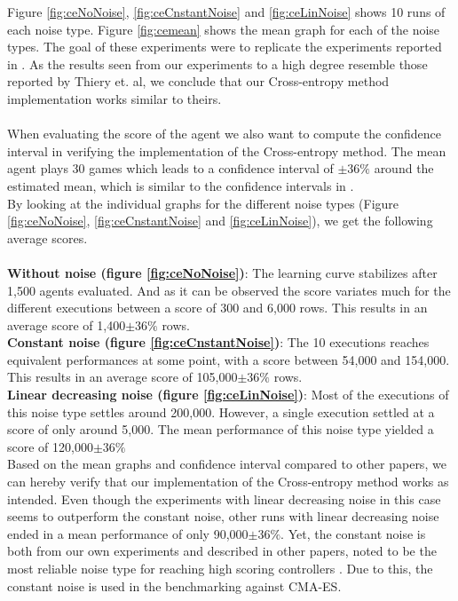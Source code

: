 Figure \ref{fig:ceNoNoise}, \ref{fig:ceCnstantNoise} and
\ref{fig:ceLinNoise} shows 10 runs of each noise type. Figure
\ref{fig:cemean} shows the mean graph for each of the noise types.
The goal of these experiments were to replicate the experiments 
reported in \citep{thiery:09}. As the results seen from our experiments
to a high degree resemble those reported by Thiery et. al, we conclude
that our Cross-entropy method implementation works similar to theirs.\\
\\
When evaluating the score of the agent we also want to compute the confidence
interval in verifying the implementation of the Cross-entropy method. The mean agent plays 30 games
which leads to a confidence interval of $\pm36\%$ around the estimated mean,
which is similar to the confidence intervals in \citep{scherrer2009}.\\
By looking at the individual graphs for the different noise types 
(Figure \ref{fig:ceNoNoise}, \ref{fig:ceCnstantNoise} and
\ref{fig:ceLinNoise}), we get the following average scores.\\
\\
\textbf{Without noise (figure \ref{fig:ceNoNoise})}: The learning curve
stabilizes after 1,500 agents evaluated. And as it can be observed the
score variates much for the different executions between a score of 300 and 6,000
rows. This results in an average score of 1,400$\pm36\%$ rows.\\
\textbf{Constant noise (figure \ref{fig:ceCnstantNoise})}: 
The 10 executions reaches equivalent performances at some point, 
with a score between
54,000 and 154,000. This results in an average score of 105,000$\pm36\%$ rows.\\
\textbf{Linear decreasing noise (figure \ref{fig:ceLinNoise})}:
Most of the executions of this noise type settles around 200,000.
However, a single execution settled at a score of only around 5,000.
The mean performance of this noise type yielded a score of
120,000$\pm36\%$ \\

Based on the mean graphs and confidence interval compared to other papers, we can
hereby verify that our implementation of the Cross-entropy method works as intended. Even though the
experiments with linear decreasing noise in this case seems to outperform
the constant noise, other runs with linear decreasing noise ended in a mean 
performance of only 90,000$\pm36\%$. Yet, the constant noise is both from our
own experiments and described in other papers, noted to be the most reliable
noise type for reaching high scoring controllers \citep{scherrer2009}. 
Due to this, the constant noise is used in the 
benchmarking against CMA-ES.\\



